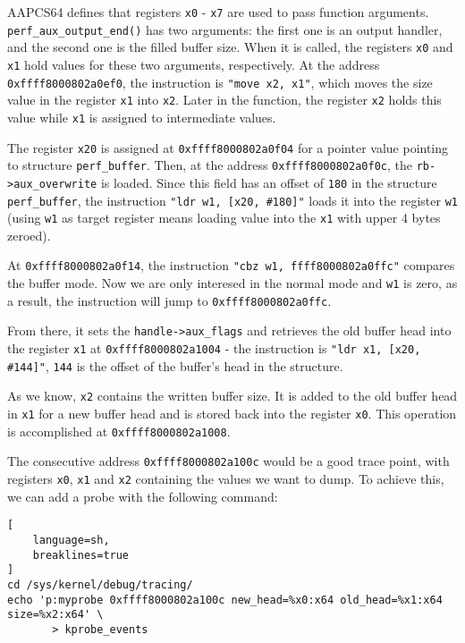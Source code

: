 \documentclass[11pt]{diazessay} %
\def\code#1{\texttt{#1}}
\begin{document}
AAPCS64 defines that registers \code{x0} - \code{x7} are used to pass
function arguments. \code{perf\_aux\_output\_end()} has two arguments: the
first one is an output handler, and the second one is the filled buffer
size. When it is called, the registers \code{x0} and \code{x1} hold values for
these two arguments, respectively. At the address \code{0xffff8000802a0ef0},
the instruction is \code{"move x2, x1"}, which moves the size value in the
register \code{x1} into \code{x2}. Later in the function, the register
\code{x2} holds this value while \code{x1} is assigned to intermediate values.

The register \code{x20} is assigned at \code{0xffff8000802a0f04} for a pointer
value pointing to structure \code{perf\_buffer}. Then, at the address
\code{0xffff8000802a0f0c}, the \code{rb->aux\_overwrite} is loaded. Since this
field has an offset of \code{180} in the structure \code{perf\_buffer}, the
instruction \code{"ldr w1, [x20, \#180]"} loads it into the register \code{w1}
(using \code{w1} as target register means loading value into the \code{x1}
with upper 4 bytes zeroed).

At \code{0xffff8000802a0f14}, the instruction \code{"cbz w1, ffff8000802a0ffc"}
compares the buffer mode. Now we are only interesed in the normal mode and
\code{w1} is zero, as a result, the instruction  will jump to
\code{0xffff8000802a0ffc}.

From there, it sets the \code{handle->aux\_flags} and retrieves the old buffer
head into the register \code{x1} at \code{0xffff8000802a1004} - the
instruction is \code{"ldr x1, [x20, \#144]"}, \code{144} is the offset of the
buffer's head in the structure.

As we know, \code{x2} contains the written buffer size. It is added to the
old buffer head in \code{x1} for a new buffer head and is stored back
into the register \code{x0}. This operation is accomplished at
\code{0xffff8000802a1008}.

The consecutive address \code{0xffff8000802a100c} would be a good trace point,
with registers \code{x0}, \code{x1} and \code{x2} containing the values we
want to dump. To achieve this, we can add a probe with the following command:

\begin{lstlisting}[
  	language=sh,
	breaklines=true
]
cd /sys/kernel/debug/tracing/
echo 'p:myprobe 0xffff8000802a100c new_head=%x0:x64 old_head=%x1:x64 size=%x2:x64' \
       > kprobe_events
\end{lstlisting}
\end{document}
